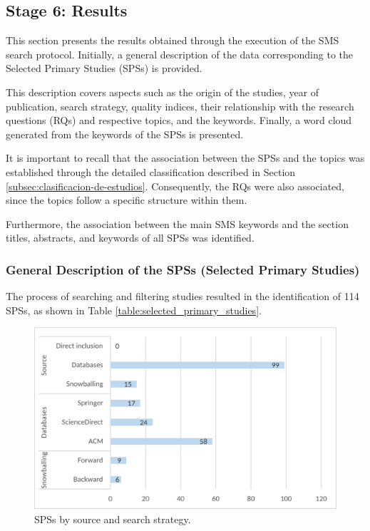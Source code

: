 \subsection{Stage 6: Results}
This section presents the results obtained through the execution of the SMS search protocol. Initially, a general description of the data corresponding to the Selected Primary Studies (SPSs) is provided.

This description covers aspects such as the origin of the studies, year of publication, search strategy, quality indices, their relationship with the research questions (RQs) and respective topics, and the keywords. Finally, a word cloud generated from the keywords of the SPSs is presented.

It is important to recall that the association between the SPSs and the topics was established through the detailed classification described in Section \ref{subsec:clasificacion-de-estudios}. Consequently, the RQs were also associated, since the topics follow a specific structure within them.

Furthermore, the association between the main SMS keywords and the section titles, abstracts, and keywords of all SPSs was identified.

\subsubsection{General Description of the SPSs (Selected Primary Studies)}
The process of searching and filtering studies resulted in the identification of 114 SPSs, as shown in Table \ref{table:selected_primary_studies}.

\begin{figure}[htbp]
	\centering
	\vspace{10pt}
	\includegraphics[scale=0.3]{resources/figures/Imagen1.eps}
	\vspace{6pt}
	\caption{SPSs by source and search strategy.}
	\label{fig:SPSsByProcedence}
\end{figure}

